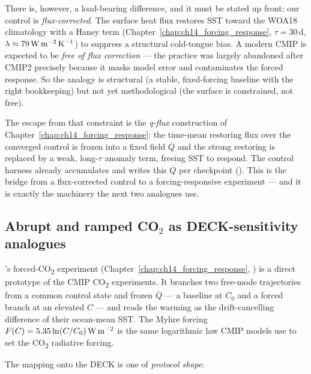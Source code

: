 There is, however, a load-bearing difference, and it must be stated up front: our
control is \emph{flux-corrected}. The surface heat flux restores SST toward the
WOA18 climatology with a Haney term (Chapter~\ref{chap:ch14_forcing_response},
$\tau=30\,$d, $\lambda\approx 79\,\mathrm{W\,m^{-2}}\,\mathrm{K^{-1}}$) to suppress a structural
cold-tongue bias. A modern CMIP  is expected to be \emph{free of
flux correction} --- the practice was largely abandoned after CMIP2 precisely
because it masks model error and contaminates the forced response. So the analogy
is structural (a stable, fixed-forcing baseline with the right bookkeeping) but not
yet methodological (the surface is constrained, not free).

The escape from that constraint is the \emph{q-flux} construction of
Chapter~\ref{chap:ch14_forcing_response}: the time-mean restoring flux over the
converged control is frozen into a fixed field $\overline{Q}$ and the strong
restoring is replaced by a weak, long-$\tau$ anomaly term, freeing SST to respond.
The control harness already accumulates and writes this $\overline{Q}$ per
checkpoint (). This is the bridge from a
flux-corrected control to a forcing-responsive experiment --- and it is exactly the
machinery the next two analogues use.

\subsection{Abrupt and ramped CO\texorpdfstring{$_2$}{2} as DECK-sensitivity analogues}\label{sec:c20_co2}

\model{}'s forced-CO\textsubscript{2} experiment
(Chapter~\ref{chap:ch14_forcing_response},
) is a direct
prototype of the CMIP CO\textsubscript{2} experiments. It branches two free-mode
trajectories from a common control state and frozen $\overline{Q}$ --- a
baseline at $C_0$ and a forced branch at an elevated $C$ --- and reads the warming
as the drift-cancelling difference of their ocean-mean SST. The Myhre forcing
$F(C)=5.35\ln(C/C_0)\,\mathrm{W\,m^{-2}}$ \citep{myhre1998} is the same logarithmic law CMIP models
use to set the CO\textsubscript{2} radiative forcing.

The mapping onto the DECK is one of \emph{protocol shape}:

